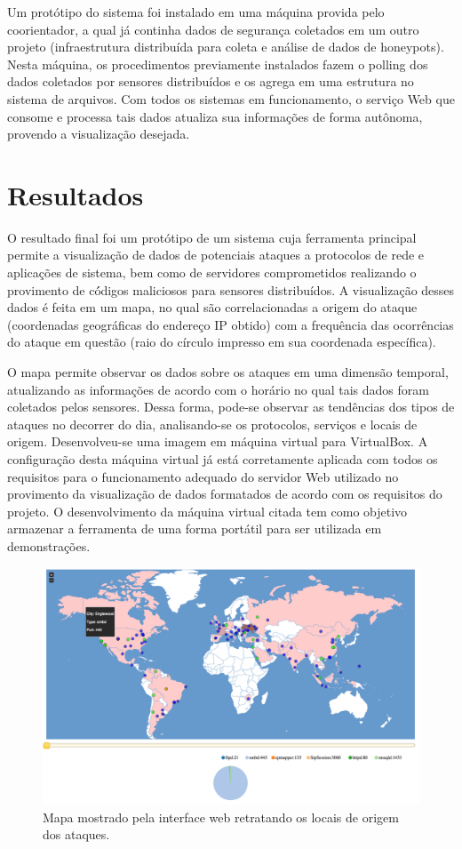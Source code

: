 \documentclass[Portuguese]
{ic-tese-v2}
\begin{document}
Um protótipo do sistema foi instalado em uma máquina provida pelo coorientador, a qual já continha dados de segurança coletados em um outro projeto (infraestrutura distribuída para coleta e análise de dados de honeypots). Nesta máquina, os procedimentos previamente instalados fazem o polling dos dados coletados por sensores distribuídos e os agrega em uma estrutura no sistema de arquivos. Com todos os sistemas em funcionamento, o serviço Web que consome e processa tais dados atualiza sua informações de forma autônoma, provendo a visualização desejada.

\chapter{Resultados}
O resultado final foi um protótipo de um sistema cuja ferramenta principal permite a visualização de dados de potenciais ataques a protocolos de rede e aplicações de sistema, bem como de servidores comprometidos realizando o provimento de có́digos maliciosos para sensores distribuídos. A visualização desses dados é feita em um mapa, no qual são correlacionadas a origem do ataque (coordenadas geográficas do endereço IP obtido) com a frequência das ocorrências do ataque em questão (raio do círculo impresso em sua coordenada específica).

O mapa permite observar os dados sobre os ataques em uma dimensão temporal, atualizando as informações de acordo com o horário no qual tais dados foram coletados pelos sensores. Dessa forma, pode-se observar as tendências dos tipos de ataques no decorrer do dia, analisando-se os protocolos, serviços e locais de origem.
Desenvolveu-se uma imagem em máquina virtual para VirtualBox. A configuração desta máquina virtual já está corretamente aplicada com todos os requisitos para o funcionamento adequado do servidor Web utilizado no provimento da visualização de dados formatados de acordo com os requisitos do projeto. O desenvolvimento da máquina virtual citada tem como objetivo armazenar a ferramenta de uma forma portátil para ser utilizada em demonstrações. 

\begin{figure}
\center
\includegraphics[width=1\textwidth]{figs/mapa.png}
\caption{Mapa mostrado pela interface web retratando os locais de origem dos ataques.}
\label{fig:mapa}
\end{figure}
\end{document}
